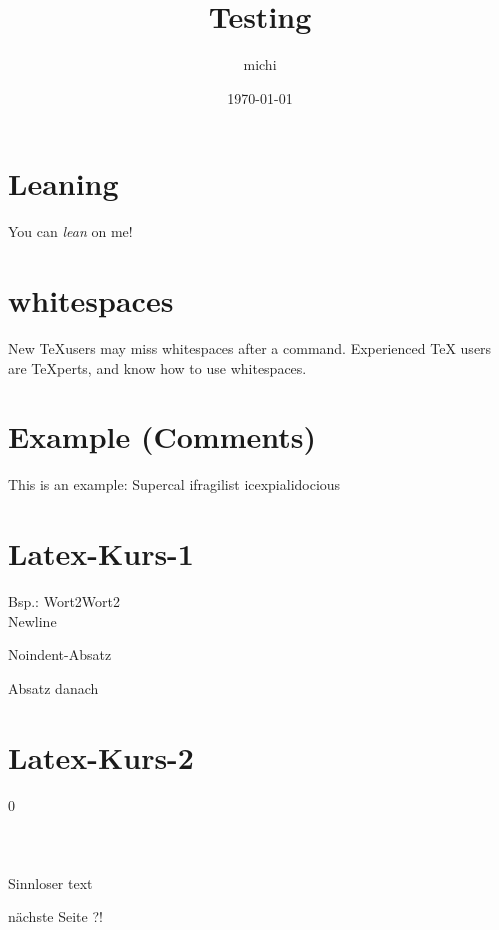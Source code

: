 \documentclass{article}
\title{Testing}
\author{michi }
\date{\today}
\begin{document}
\maketitle

\section{Leaning}
You can \textsl{lean} on me!

\section{whitespaces}
New \TeX users may miss whitespaces
after a command. %
Experienced \TeX{} users are
\TeX perts, and know how to use
whitespaces. %


\section{Example (Comments)}
This is an %
example: Supercal%
ifragilist%
icexpialidocious




\section{Latex-Kurs-1}

Bsp.: Wort2\hspace{2cm}Wort2 \\
Newline


\noindent
Noindent-Absatz


Absatz danach



\section{Latex-Kurs-2}
0 \\
 \\
 \\
 \\

\noindent
Sinnloser text 


\newpage

nächste Seite ?!





\end{document}
